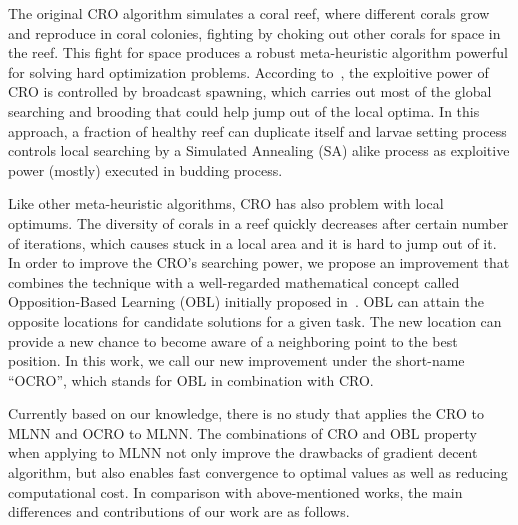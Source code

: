 \documentclass[smallcondensed, natbib]{svjour3}     %
\begin{document}
The original CRO algorithm simulates a coral reef, where different corals grow and reproduce in coral colonies, fighting by choking out other corals for space in the reef. This fight for space produces a robust meta-heuristic algorithm powerful for solving hard optimization problems. According to~\citep{ref_salcedo_sanz5}, the exploitive power of CRO is controlled by broadcast spawning, which carries out most of the global searching and brooding that could help jump out of the local optima. In this approach, a fraction of healthy reef can duplicate itself and larvae setting process controls local searching by a Simulated Annealing (SA) alike process as exploitive power (mostly) executed in budding process. 

Like other meta-heuristic algorithms, CRO has also problem with local optimums. The diversity of corals in a reef quickly decreases after certain number of iterations, which causes stuck in a local area and it is hard to jump out of it. In order to improve the CRO's searching power, we propose an improvement that combines the technique with a well-regarded mathematical concept called Opposition-Based Learning (OBL) initially proposed in~\citep{ref_Tizhoosh}. OBL can attain the opposite locations for candidate solutions for a given task. The new location can provide a new chance to become aware of a neighboring point to the best position. In this work, we call our new improvement under the short-name ``OCRO'', which stands for OBL in combination with CRO. 

Currently based on our knowledge, there is no study that applies the CRO to MLNN and OCRO to MLNN. The combinations of CRO and OBL property when applying to MLNN not only improve the drawbacks of gradient decent algorithm, but also enables fast convergence to optimal values as well as reducing computational cost. In comparison with above-mentioned works, the main differences and contributions of our work are as follows.
\end{document}
